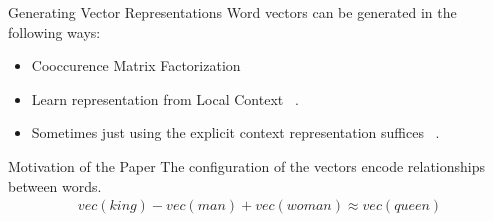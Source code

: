 \begin{frame}{Generating Vector Representations}
  Word vectors can be generated in the following ways:
  \begin{itemize}[<+->]
  \item Cooccurence Matrix Factorization ~\cite{Deerwester}
  \item Learn representation from Local Context ~\cite{Mikolov13a}.
  \item Sometimes just using the explicit context representation suffices ~\cite{Levy14}.
  \end{itemize}
\end{frame}

\begin{frame}{Motivation of the Paper}
  The configuration of the vectors encode relationships between words.
  \begin{align*}
    vec(king) - vec(man) + vec(woman) \approx vec(queen)
  \end{align*}
  \pause
\end{frame}

